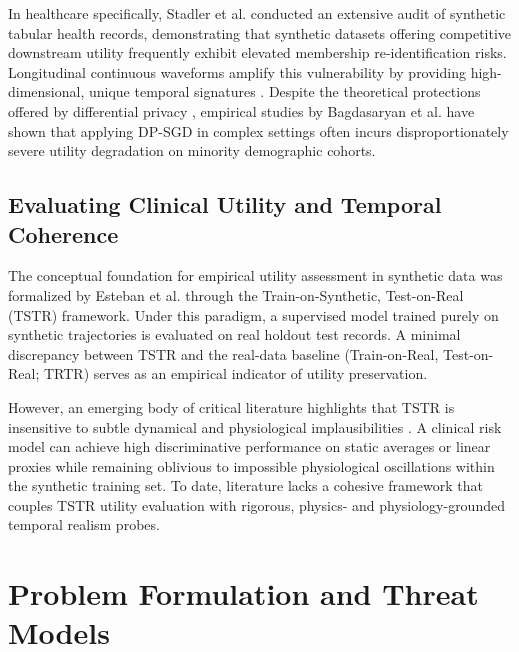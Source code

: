 \documentclass[journal]{IEEEtran}
\begin{document}
In healthcare specifically, Stadler et al. \cite{stadler2021privacy, stadler2022synthetic} conducted an extensive audit of synthetic tabular health records, demonstrating that synthetic datasets offering competitive downstream utility frequently exhibit elevated membership re-identification risks. Longitudinal continuous waveforms amplify this vulnerability by providing high-dimensional, unique temporal signatures \cite{esteban2017real}. Despite the theoretical protections offered by differential privacy \cite{dwork2014algorithmic}, empirical studies by Bagdasaryan et al. \cite{bagdasaryan2019differential} have shown that applying DP-SGD in complex settings often incurs disproportionately severe utility degradation on minority demographic cohorts.

\subsection{Evaluating Clinical Utility and Temporal Coherence}
The conceptual foundation for empirical utility assessment in synthetic data was formalized by Esteban et al. \cite{esteban2017real} through the Train-on-Synthetic, Test-on-Real (TSTR) framework. Under this paradigm, a supervised model trained purely on synthetic trajectories is evaluated on real holdout test records. A minimal discrepancy between TSTR and the real-data baseline (Train-on-Real, Test-on-Real; TRTR) serves as an empirical indicator of utility preservation.

However, an emerging body of critical literature highlights that TSTR is insensitive to subtle dynamical and physiological implausibilities \cite{hernandez2022synthetic, theis2016note}. A clinical risk model can achieve high discriminative performance on static averages or linear proxies while remaining oblivious to impossible physiological oscillations within the synthetic training set. To date, literature lacks a cohesive framework that couples TSTR utility evaluation with rigorous, physics- and physiology-grounded temporal realism probes.

\section{Problem Formulation and Threat Models}
\end{document}
